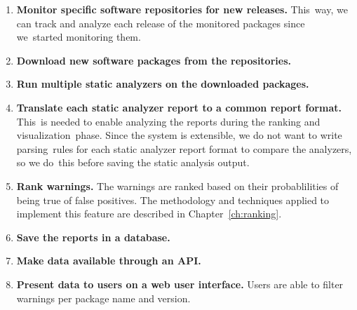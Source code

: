 \begin{enumerate}
\item \textbf{Monitor specific software repositories for new releases.} This\
way, we can track and analyze each release of the monitored packages since we\
started monitoring them.

\item \textbf{Download new software packages from the repositories.}

\item \textbf{Run multiple static analyzers on the downloaded packages.}

\item \textbf{Translate each static analyzer report to a common report format.} This\
is needed to enable analyzing the reports during the ranking and visualization\
phase. Since the system is extensible, we do not want to write parsing\
rules for each static analyzer report format to compare the analyzers, so we do\
this before saving the static analysis output.

\item \textbf{Rank warnings.} The warnings are ranked based on their probablilities of being true of false positives. The methodology and techniques applied to implement this feature are described in Chapter~\ref{ch:ranking}.

\item \textbf{Save the reports in a database.}

\item \textbf{Make data available through an API.}

\item \textbf{Present data to users on a web user interface.} Users are able to filter warnings per package name and version.
\end{enumerate}


